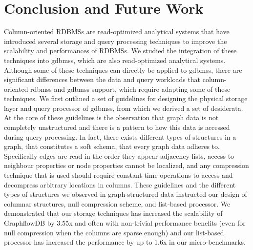 \chapter{Conclusion and Future Work}
\label{c:conclusion-future-work}

Column-oriented RDBMSs are read-optimized analytical systems that have introduced several storage and query processing techniques to improve the scalability and performances of RDBMSs. We studied the integration of these techniques into \gls{gdbms}s, which are also read-optimized analytical systems. Although some of these techniques can directly be applied to \gls{gdbms}s, there are significant differences between the data and query workloads that column-oriented \gls{rdbms}s and \gls{gdbms}s support, which require adapting some of these techniques. We first outlined a set of guidelines for designing the physical storage layer and query processor of \gls{gdbms}s, from which we derived a set of desiderata. At the core of these guidelines is the observation that graph data is not completely unstructured and there is a pattern to how this data is accessed during query processing. In fact, there exists different types of structures in a graph, that constitutes a soft schema, that every graph data adheres to. Specifically edges are read in the order they appear adjacency lists, access to neighbour properties or node properties cannot be localized, and any compression technique that is used should require constant-time operations to access and decompress arbitrary locations in columns. These guidelines and the different types of structures we observed in graph-structured data instructed our design of columnar structures, null compression scheme, and list-based processor. We demonstrated that our storage techniques has increased the scalability of GraphflowDB by 3.55x and often with non-trivial performance benefits (even for null compression when the columns are sparse enough) and our list-based processor has increased the performance by up to 1.6x in our micro-benchmarks. 




